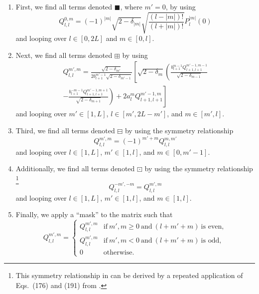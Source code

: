 \begin{enumerate}

\item First, we find all terms denoted $\blacksquare$, where $m' = 0$, by using \citep[Eq.~(189)]{Zotter2009PhD}
\begin{equation}
Q_{l,l}^{0,m} = (-1)^{|m|} \sqrt{2 - \delta_{|m|}} \sqrt{ \frac{(l - |m|)!}{(l + |m|)!} } P_l^{|m|}(0)
\end{equation} %
and looping over $l \in [0,2L]$ and $m \in [0,l]$.

\item Next, we find all terms denoted $\boxplus$ by using \citep[Eq.~(190)]{Zotter2009PhD}
\begin{multline}
Q_{l,l}^{m',m} = \frac{\sqrt{2 - \delta_{m'}}}{2 b_{l+1}^{m'-1} \sqrt{2 - \delta_{m'-1}}} \left[ \sqrt{2 - \delta_m} \left( \frac{b_{l+1}^{m-1} Q_{l+1,l+1}^{m'-1,m-1}}{\sqrt{2 - \delta_{m-1}}} \right. \right. \\
\left. \left. - \frac{b_{l+1}^{-m-1} Q_{l+1,l+1}^{m'-1,m+1}}{\sqrt{2 - \delta_{m+1}}} \right) + 2 a_l^m Q_{l+1,l+1}^{m'-1,m} \right]
\end{multline} %
and looping over $m' \in [1,L]$, $l \in [m',2L - m']$, and $m \in [m',l]$.

\item Third, we find all terms denoted $\boxminus$ by using the symmetry relationship \citep[Eq.~(191)]{Zotter2009PhD}
\begin{equation}
Q_{l,l}^{m',m} = (-1)^{m'+m} Q_{l,l}^{m,m'}
\end{equation} %
and looping over $l \in [1,L]$, $m' \in [1,l]$, and $m \in [0,m' - 1]$.

\item Additionally, we find all terms denoted $\boxdot$ by using the symmetry relationship%
\footnote{This symmetry relationship in  can be derived by a repeated application of Eqs.~(176) and (191) from \citet{Zotter2009PhD}.}
\begin{equation}\label{eq:A1_Navigation_Filters:Pitch_Symmetry_176}
Q_{l,l}^{-m',-m} = Q_{l,l}^{m',m}
\end{equation}  %
and looping over $l \in [1,L]$, $m' \in [1,l]$, and $m \in [1,l]$.

\item Finally, we apply a ``mask'' to the matrix such that \citep[Eq.~(187)]{Zotter2009PhD}
\begin{equation}
Q_{l,l}^{m',m} = 
\begin{cases}
Q_{l,l}^{m',m} & \text{if}~m',m \geq 0~\text{and}~(l+m'+m)~\text{is even},\\
Q_{l,l}^{m',m} & \text{if}~m',m < 0~\text{and}~(l+m'+m)~\text{is odd},\\
0 & \text{otherwise}.
\end{cases}
\end{equation} %

\end{enumerate}

